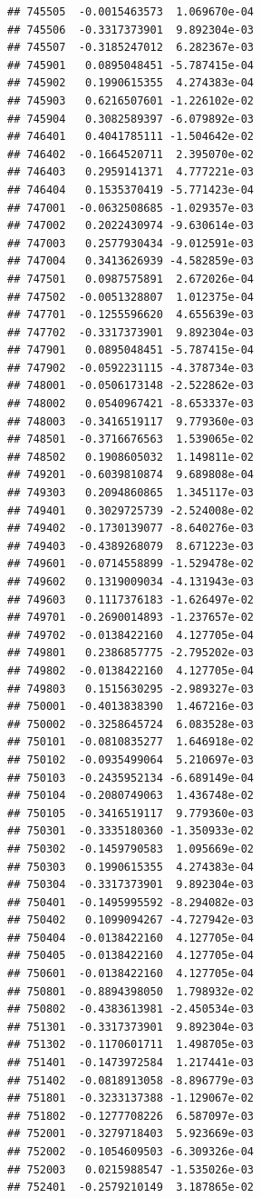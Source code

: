 \documentclass[ignorenonframetext,]{beamer}
\begin{document}
\begin{frame}[fragile]
\begin{verbatim}
## 745505  -0.0015463573  1.069670e-04
## 745506  -0.3317373901  9.892304e-03
## 745507  -0.3185247012  6.282367e-03
## 745901   0.0895048451 -5.787415e-04
## 745902   0.1990615355  4.274383e-04
## 745903   0.6216507601 -1.226102e-02
## 745904   0.3082589397 -6.079892e-03
## 746401   0.4041785111 -1.504642e-02
## 746402  -0.1664520711  2.395070e-02
## 746403   0.2959141371  4.777221e-03
## 746404   0.1535370419 -5.771423e-04
## 747001  -0.0632508685 -1.029357e-03
## 747002   0.2022430974 -9.630614e-03
## 747003   0.2577930434 -9.012591e-03
## 747004   0.3413626939 -4.582859e-03
## 747501   0.0987575891  2.672026e-04
## 747502  -0.0051328807  1.012375e-04
## 747701  -0.1255596620  4.655639e-03
## 747702  -0.3317373901  9.892304e-03
## 747901   0.0895048451 -5.787415e-04
## 747902  -0.0592231115 -4.378734e-03
## 748001  -0.0506173148 -2.522862e-03
## 748002   0.0540967421 -8.653337e-03
## 748003  -0.3416519117  9.779360e-03
## 748501  -0.3716676563  1.539065e-02
## 748502   0.1908605032  1.149811e-02
## 749201  -0.6039810874  9.689808e-04
## 749303   0.2094860865  1.345117e-03
## 749401   0.3029725739 -2.524008e-02
## 749402  -0.1730139077 -8.640276e-03
## 749403  -0.4389268079  8.671223e-03
## 749601  -0.0714558899 -1.529478e-02
## 749602   0.1319009034 -4.131943e-03
## 749603   0.1117376183 -1.626497e-02
## 749701  -0.2690014893 -1.237657e-02
## 749702  -0.0138422160  4.127705e-04
## 749801   0.2386857775 -2.795202e-03
## 749802  -0.0138422160  4.127705e-04
## 749803   0.1515630295 -2.989327e-03
## 750001  -0.4013838390  1.467216e-03
## 750002  -0.3258645724  6.083528e-03
## 750101  -0.0810835277  1.646918e-02
## 750102  -0.0935499064  5.210697e-03
## 750103  -0.2435952134 -6.689149e-04
## 750104  -0.2080749063  1.436748e-02
## 750105  -0.3416519117  9.779360e-03
## 750301  -0.3335180360 -1.350933e-02
## 750302  -0.1459790583  1.095669e-02
## 750303   0.1990615355  4.274383e-04
## 750304  -0.3317373901  9.892304e-03
## 750401  -0.1495995592 -8.294082e-03
## 750402   0.1099094267 -4.727942e-03
## 750404  -0.0138422160  4.127705e-04
## 750405  -0.0138422160  4.127705e-04
## 750601  -0.0138422160  4.127705e-04
## 750801  -0.8894398050  1.798932e-02
## 750802  -0.4383613981 -2.450534e-03
## 751301  -0.3317373901  9.892304e-03
## 751302  -0.1170601711  1.498705e-03
## 751401  -0.1473972584  1.217441e-03
## 751402  -0.0818913058 -8.896779e-03
## 751801  -0.3233137388 -1.129067e-02
## 751802  -0.1277708226  6.587097e-03
## 752001  -0.3279718403  5.923669e-03
## 752002  -0.1054609503 -6.309326e-04
## 752003   0.0215988547 -1.535026e-03
## 752401  -0.2579210149  3.187865e-02

\end{verbatim}
\end{frame}
\end{document}

